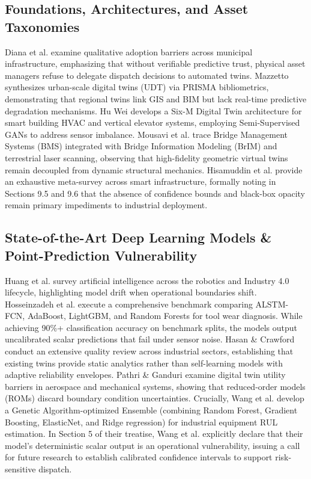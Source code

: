 \documentclass[journal,10pt,twocolumn]{article}
\begin{document}
\subsection{Foundations, Architectures, and Asset Taxonomies}
Diana et al. \cite{diana2025role} examine qualitative adoption barriers across municipal infrastructure, emphasizing that without verifiable predictive trust, physical asset managers refuse to delegate dispatch decisions to automated twins. Mazzetto \cite{mazzetto2024review} synthesizes urban-scale digital twins (UDT) via PRISMA bibliometrics, demonstrating that regional twins link GIS and BIM but lack real-time predictive degradation mechanisms. Hu Wei \cite{huwei2024thesis} develops a Six-M Digital Twin architecture for smart building HVAC and vertical elevator systems, employing Semi-Supervised GANs to address sensor imbalance. Mousavi et al. \cite{mousavi2024evolution} trace Bridge Management Systems (BMS) integrated with Bridge Information Modeling (BrIM) and terrestrial laser scanning, observing that high-fidelity geometric virtual twins remain decoupled from dynamic structural mechanics. Hisamuddin et al. \cite{hisamuddin2026ai} provide an exhaustive meta-survey across smart infrastructure, formally noting in Sections 9.5 and 9.6 that the absence of confidence bounds and black-box opacity remain primary impediments to industrial deployment.

\subsection{State-of-the-Art Deep Learning Models \& Point-Prediction Vulnerability}
Huang et al. \cite{huang2024survey} survey artificial intelligence across the robotics and Industry 4.0 lifecycle, highlighting model drift when operational boundaries shift. Hosseinzadeh et al. \cite{hosseinzadeh2023benchmarking} execute a comprehensive benchmark comparing ALSTM-FCN, AdaBoost, LightGBM, and Random Forests for tool wear diagnosis. While achieving 90\%+ classification accuracy on benchmark splits, the models output uncalibrated scalar predictions that fail under sensor noise. Hasan \& Crawford \cite{hasan2025new} conduct an extensive quality review across industrial sectors, establishing that existing twins provide static analytics rather than self-learning models with adaptive reliability envelopes. Pathri \& Ganduri \cite{pathri2025digital} examine digital twin utility barriers in aerospace and mechanical systems, showing that reduced-order models (ROMs) discard boundary condition uncertainties. Crucially, Wang et al. \cite{wang2026digital} develop a Genetic Algorithm-optimized Ensemble (combining Random Forest, Gradient Boosting, ElasticNet, and Ridge regression) for industrial equipment RUL estimation. In Section 5 of their treatise, Wang et al. explicitly declare that their model’s deterministic scalar output is an operational vulnerability, issuing a call for future research to establish calibrated confidence intervals to support risk-sensitive dispatch.
\end{document}
